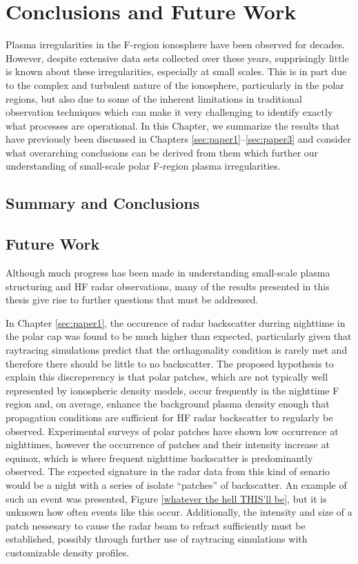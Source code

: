 
\chapter{Conclusions and Future Work}
\label{sec:conclusion}

Plasma irregularities in the F-region ionosphere have been observed for decades.  However, despite extensive data sets collected over these years, supprisingly little is known about these irregularities, especially at small scales.  This is in part due to the complex and turbulent nature of the ionosphere, particularly in the polar regions, but also due to some of the inherent limitations in traditional observation techniques which can make it very challenging to identify exactly what processes are operational.  In this Chapter, we summarize the results that have previously been discussed in Chapters \ref{sec:paper1}--\ref{sec:paper3} and consider what overarching conclusions can be derived from them which further our understanding of small-scale polar F-region plasma irregularities.

\section{Summary and Conclusions}
\label{sec:summary}



\section{Future Work}
\label{sec:futurework}

Although much progress has been made in understanding small-scale plasma structuring and HF radar observations, many of the results presented in this thesis give rise to further questions that must be addressed.

In Chapter \ref{sec:paper1}, the occurence of radar backscatter durring nighttime in the polar cap was found to be much higher than expected, particularly given that raytracing simulations predict that the orthagonality condition is rarely met and therefore there should be little to no backscatter.  The proposed hypothesis to explain this discreperency is that polar patches, which are not typically well represented by ionospheric density models, occur frequently in the nighttime F region and, on average, enhance the background plasma density enough that propagation conditions are sufficient for HF radar backscatter to regularly be observed.  Experimental surveys of polar patches have shown low occurrence at nighttimes, however the occurrence of patches and their intensity increase at equinox, which is where frequent nighttime backscatter is predominantly observed.  The expected signature in the radar data from this kind of senario would be a night with a series of isolate ``patches'' of backscatter.  An example of such an event was presented, Figure \ref{whatever the hell THIS'll be}, but it is unknown how often events like this occur.  Additionally, the intensity and size of a patch nessesary to cause the radar beam to refract sufficiently must be established, possibly through further use of raytracing simulations with customizable density profiles.

